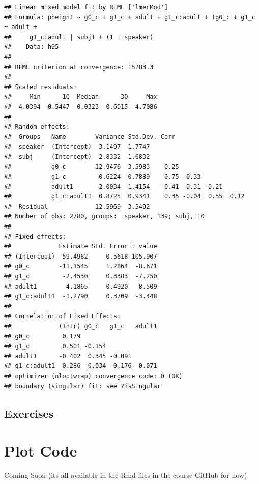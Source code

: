 \documentclass[
]{book}
\begin{document}
\begin{verbatim}
## Linear mixed model fit by REML ['lmerMod']
## Formula: pheight ~ g0_c + g1_c + adult + g1_c:adult + (g0_c + g1_c + adult +  
##     g1_c:adult | subj) + (1 | speaker)
##    Data: h95
## 
## REML criterion at convergence: 15283.3
## 
## Scaled residuals: 
##     Min      1Q  Median      3Q     Max 
## -4.0394 -0.5447  0.0323  0.6015  4.7086 
## 
## Random effects:
##  Groups   Name        Variance Std.Dev. Corr                   
##  speaker  (Intercept)  3.1497  1.7747                          
##  subj     (Intercept)  2.8332  1.6832                          
##           g0_c        12.9476  3.5983    0.25                  
##           g1_c         0.6224  0.7889    0.75 -0.33            
##           adult1       2.0034  1.4154   -0.41  0.31 -0.21      
##           g1_c:adult1  0.8725  0.9341    0.35 -0.04  0.55  0.12
##  Residual             12.5969  3.5492                          
## Number of obs: 2780, groups:  speaker, 139; subj, 10
## 
## Fixed effects:
##             Estimate Std. Error t value
## (Intercept)  59.4982     0.5618 105.907
## g0_c        -11.1545     1.2864  -8.671
## g1_c         -2.4530     0.3383  -7.250
## adult1        4.1865     0.4920   8.509
## g1_c:adult1  -1.2790     0.3709  -3.448
## 
## Correlation of Fixed Effects:
##             (Intr) g0_c   g1_c   adult1
## g0_c         0.179                     
## g1_c         0.501 -0.154              
## adult1      -0.402  0.345 -0.091       
## g1_c:adult1  0.286 -0.034  0.176  0.071
## optimizer (nloptwrap) convergence code: 0 (OK)
## boundary (singular) fit: see ?isSingular
\end{verbatim}

\hypertarget{exercises-5}{%
\section{Exercises}\label{exercises-5}}

\hypertarget{plot-code}{%
\chapter{Plot Code}\label{plot-code}}

Coming Soon (its all available in the Rmd files in the course GitHub for now).
\end{document}
